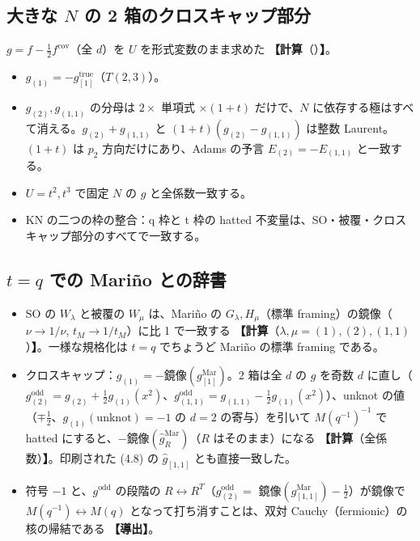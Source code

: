 \documentclass[a4paper,10pt]{ltjsarticle}
\newcommand{\deriv}{\textbf{【導出】}}
\newcommand{\comp}[1]{\textbf{【計算}\if\relax\detokenize{#1}\relax\else（#1）\fi\textbf{】}}
\begin{document}
\subsection{大きな $N$ の 2 箱のクロスキャップ部分}
$g = f - \tfrac12 f^{\mathrm{cov}}$（全 $d$）を $U$ を形式変数のまま求めた \comp{}。
\begin{itemize}
\item $g_{(1)} = -g^{\mathrm{true}}_{[1]}$（$T(2,3)$）。
\item $g_{(2)}, g_{(1,1)}$ の分母は $2 \times$ 単項式 $\times (1 + t)$ だけで、$N$ に依存する極はすべて消える。$g_{(2)} + g_{(1,1)}$ と $(1+t)(g_{(2)} - g_{(1,1)})$ は整数 Laurent。$(1+t)$ は $p_2$ 方向だけにあり、Adams の予言 $E_{(2)} = -E_{(1,1)}$ と一致する。
\item $U = t^2, t^3$ で固定 $N$ の $g$ と全係数一致する。
\item KN の二つの枠の整合：q 枠と t 枠の hatted 不変量は、SO・被覆・クロスキャップ部分のすべてで一致する。
\end{itemize}

\subsection{$t = q$ での Mariño との辞書}
\begin{itemize}
\item SO の $W_\lambda$ と被覆の $W_\mu$ は、Mariño の $G_\lambda, H_\mu$（標準 framing）の鏡像（$\nu \to 1/\nu$, $t_M \to 1/t_M$）に比 1 で一致する \comp{$\lambda, \mu = (1), (2), (1,1)$}。一様な規格化は $t = q$ でちょうど Mariño の標準 framing である。
\item クロスキャップ：$g_{(1)} = -$鏡像$(g^{\mathrm{Mar}}_{[1]})$。2 箱は全 $d$ の $g$ を奇数 $d$ に直し（$g^{\mathrm{odd}}_{(2)} = g_{(2)} + \tfrac12 g_{(1)}(x^2)$、$g^{\mathrm{odd}}_{(1,1)} = g_{(1,1)} - \tfrac12 g_{(1)}(x^2)$）、unknot の値（$\mp \tfrac12$、$g_{(1)}({\mathrm{unknot}}) = -1$ の $d = 2$ の寄与）を引いて $M(q^{-1})^{-1}$ で hatted にすると、$-$鏡像$(\hat g^{\mathrm{Mar}}_R)$（$R$ はそのまま）になる \comp{全係数}。印刷された (4.8) の $\hat g_{[1,1]}$ とも直接一致した。
\item 符号 $-1$ と、$g^{\mathrm{odd}}$ の段階の $R \leftrightarrow R^T$（$g^{\mathrm{odd}}_{(2)} = $ 鏡像$(g^{\mathrm{Mar}}_{[1,1]}) - \tfrac12$）が鏡像で $M(q^{-1}) \leftrightarrow M(q)$ となって打ち消すことは、双対 Cauchy（fermionic）の核の帰結である \deriv。
\end{itemize}
\end{document}
